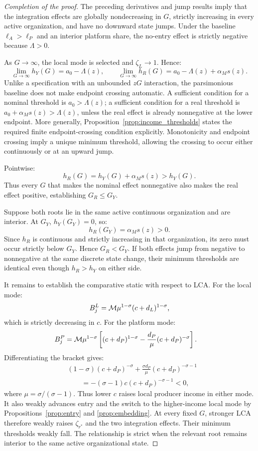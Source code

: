 \begin{proof}[Completion of the proof]
The preceding derivatives and jump results imply that the integration effects
are globally nondecreasing in \(G\), strictly increasing in every active
organization, and have no downward state jumps.  Under the baseline
\(\ell_A>\ell_P\) and an interior platform share, the no-entry effect is
strictly negative because \(\Lambda>0\).

As \(G\rightarrow\infty\), the local mode is selected and
\(\zeta_L\rightarrow1\).  Hence:
\[
\lim_{G\to\infty}h_Y(G)=a_0-\Lambda(z),
\qquad
\lim_{G\to\infty}h_R(G)
=a_0-\Lambda(z)+\alpha_Ms(z).
\]
Unlike a specification with an unbounded \(zG\) interaction, the parsimonious
baseline does not make endpoint crossing automatic.  A sufficient condition
for a nominal threshold is \(a_0>\Lambda(z)\); a sufficient condition for a
real threshold is
\(a_0+\alpha_Ms(z)>\Lambda(z)\), unless the real effect is already
nonnegative at the lower endpoint.  More generally, Proposition~\ref{prop:income_thresholds}
states the required finite endpoint-crossing condition explicitly.
Monotonicity and endpoint crossing imply a unique minimum threshold, allowing
the crossing to occur either continuously or at an upward jump.

Pointwise:
\[
h_R(G)=h_Y(G)+\alpha_Ms(z)>h_Y(G).
\]
Thus every \(G\) that makes the nominal effect nonnegative also makes the real
effect positive, establishing \(G_R\leq G_Y\).

Suppose both roots lie in the same active continuous organization and are
interior.  At \(G_Y\), \(h_Y(G_Y)=0\), so:
\[
h_R(G_Y)=\alpha_Ms(z)>0.
\]
Since \(h_R\) is continuous and strictly increasing in that organization, its
zero must occur strictly below \(G_Y\).  Hence \(G_R<G_Y\).  If both effects
jump from negative to nonnegative at the same discrete state change, their
minimum thresholds are identical even though \(h_R>h_Y\) on either side.

It remains to establish the comparative static with respect to LCA.  For the
local mode:
\[
B_j^L
=
\mathcal M\mu^{1-\sigma}(c+d_L)^{1-\sigma},
\]
which is strictly decreasing in \(c\).  For the platform mode:
\begin{align*}
B_j^P
&=
\mathcal M\mu^{1-\sigma}
\left[
(c+d_P)^{1-\sigma}
-\frac{d_P}{\mu}(c+d_P)^{-\sigma}
\right].
\end{align*}
Differentiating the bracket gives:
\begin{align*}
&(1-\sigma)(c+d_P)^{-\sigma}
+\frac{\sigma d_P}{\mu}(c+d_P)^{-\sigma-1}\\
&\qquad
=-(\sigma-1)c(c+d_P)^{-\sigma-1}<0,
\end{align*}
where \(\mu=\sigma/(\sigma-1)\).  Thus lower \(c\) raises local producer
income in either mode.  It also weakly advances entry and the switch to the
higher-income local mode by Propositions~\ref{prop:entry} and
\ref{prop:embedding}.  At every fixed \(G\), stronger LCA therefore weakly
raises \(\zeta_{r^*}\) and the two integration effects.  Their minimum
thresholds weakly fall.  The relationship is strict when the relevant root
remains interior to the same active organizational state.
\end{proof}

